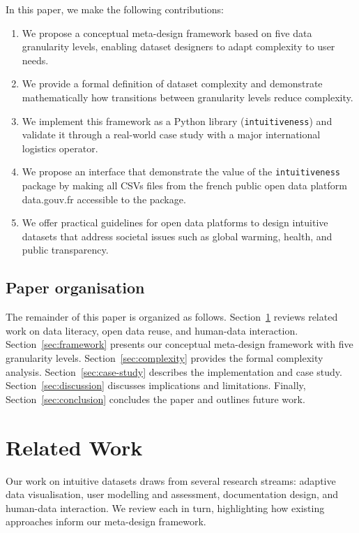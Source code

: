 \documentclass[12pt,a4paper]{article}
\begin{document}
In this paper, we make the following contributions:
\begin{enumerate}
    \item We propose a conceptual meta-design framework based on five data granularity levels, enabling dataset designers to adapt complexity to user needs.
    \item We provide a formal definition of dataset complexity and demonstrate mathematically how transitions between granularity levels reduce complexity.
    \item We implement this framework as a Python library (\texttt{intuitiveness}) and validate it through a real-world case study with a major international logistics operator.
    \item We propose an interface that demonstrate the value of the \texttt{intuitiveness} package by making all CSVs files from the french public open data platform data.gouv.fr accessible to the package. 
    \item We offer practical guidelines for open data platforms to design intuitive datasets that address societal issues such as global warming, health, and public transparency.
\end{enumerate}

\subsection{Paper organisation}

The remainder of this paper is organized as follows. Section~\ref{sec:related-work} reviews related work on data literacy, open data reuse, and human-data interaction. Section~\ref{sec:framework} presents our conceptual meta-design framework with five granularity levels. Section~\ref{sec:complexity} provides the formal complexity analysis. Section~\ref{sec:case-study} describes the implementation and case study. Section~\ref{sec:discussion} discusses implications and limitations. Finally, Section~\ref{sec:conclusion} concludes the paper and outlines future work.

\section{Related Work}
\label{sec:related-work}

Our work on intuitive datasets draws from several research streams: adaptive data visualisation, user modelling and assessment, documentation design, and human-data interaction. We review each in turn, highlighting how existing approaches inform our meta-design framework.
\end{document}
